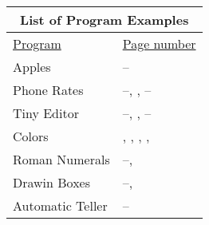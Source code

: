 
\cleardoublepage
\pagestyle{headings}
%
\tableofcontents
\clearpage
\begin{tabular}{ll}
\multicolumn{2}{c}{\sf\textbf{\large List of Program Examples}} \\ \hline
{\Large\strut}\underline{Program} & \underline{Page number} \\
Apples & \pageref{apples1}--\pageref{apples2} \\
Phone Rates & \pageref{phone1}--\pageref{phone2}, \pageref{phone3}, \pageref{phone4}--\pageref{phone5} \\
Tiny Editor & \pageref{editor1}--\pageref{editor2}, \pageref{editor3}, \pageref{editor4}--\pageref{editor5} \\
Colors & \pageref{color1}, \pageref{color2}, \pageref{color3}, \pageref{color4}, \pageref{color5} \\
Roman Numerals & \pageref{roman1}--\pageref{roman2}, \pageref{roman3}\\
Drawin Boxes & \pageref{boxes1}--\pageref{boxes2}, \pageref{boxes3}\\
Automatic Teller & \pageref{teller1}--\pageref{teller2}\\
\end{tabular}
\makeatletter
\renewcommand\numberline[1]{\hb@xt@\@tempdima{#1\hfil}}
\makeatother
\setcounter{tocdepth}{4}
\sectionlabelfalse
